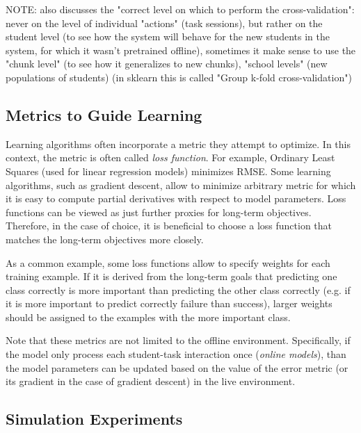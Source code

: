 
NOTE: \cite{student-models-review-2012} also discusses the "correct level on
which to perform the cross-validation": never on the level of individual
"actions" (task sessions), but rather on the student level (to see how the
system will behave for the new students in the system, for which it wasn't
pretrained offline), sometimes it make sense to use the "chunk level"
(to see how it generalizes to new chunks), "school levels" (new populations of
students)
(in sklearn this is called "Group k-fold cross-validation")

\subsection{Metrics to Guide Learning}
\label{sec:metrics-to-guide-learning}

Learning algorithms often incorporate a metric they attempt to optimize.
In this context, the metric is often called \emph{loss function}.
For example,
  Ordinary Least Squares (used for linear regression models) minimizes RMSE.
Some learning algorithms, such as gradient descent,
  allow to minimize arbitrary metric
  for which it is easy to compute partial derivatives with respect to model parameters.
Loss functions can be viewed as just further proxies for long-term objectives.
Therefore, in the case of choice, it is beneficial to choose a loss function
  that matches the long-term objectives more closely.

As a common example, some loss functions allow to specify weights for each training example.
If it is derived from the long-term goals that predicting one class correctly
  is more important than predicting the other class correctly
  (e.g. if it is more important to predict correctly failure than success),
  larger weights should be assigned to the examples with the more important class.

Note that these metrics are not limited to the offline environment. Specifically, if the
model only process each student-task interaction once (\emph{online models}), than the
model parameters can be updated based on the value of the error metric
(or its gradient in the case of gradient descent) in the live environment.

\subsection{Simulation Experiments}


